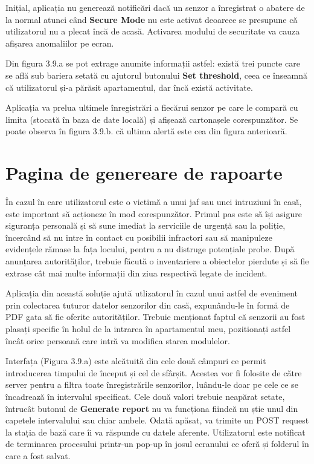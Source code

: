 Inițial, aplicația nu generează notificări dacă un senzor a înregistrat o abatere de la normal atunci când \textbf{Secure Mode} nu este activat deoarece se presupune că utilizatorul nu a plecat încă de acasă. Activarea modului de securitate va cauza afișarea anomaliilor pe ecran.

Din figura 3.9.a se pot extrage anumite informații astfel: există trei puncte care se află sub bariera setată cu ajutorul butonului \textbf{Set threshold}, ceea ce înseamnă că utilizatorul și-a părăsit apartamentul, dar încă există activitate. 

Aplicația va prelua ultimele înregistrări a fiecărui senzor pe care le compară cu limita (stocată în baza de date locală) și afișează cartonașele corespunzător. Se poate observa în figura 3.9.b. că ultima alertă este cea din figura anterioară.

\break

\section{Pagina de genereare de rapoarte}

În cazul în care utilizatorul este o victimă a unui jaf sau unei intruziuni în casă, este important să acționeze în mod corespunzător. Primul pas este să își asigure siguranța personală și să sune imediat la serviciile de urgență sau la poliție, încercând să nu intre în contact cu posibilii infractori sau să manipuleze evidențele rămase la fața locului, pentru a nu distruge potențiale probe. După anunțarea autorităților, trebuie făcută o inventariere a obiectelor pierdute și să fie extrase cât mai multe informații din ziua respectivă legate de incident.

Aplicația din această soluție ajută utlizatorul în cazul unui astfel de eveniment prin colectarea tuturor datelor senzorilor din casă, expunându-le în formă de PDF gata să fie oferite autorităților. Trebuie menționat faptul că senzorii au fost plasați specific în holul de la intrarea în apartamentul meu, pozitionați astfel încât orice persoană care intră va modifica starea modulelor.

Interfața (Figura 3.9.a) este alcătuită din cele două câmpuri ce permit introducerea timpului de început și cel de sfârșit. Acestea vor fi folosite de către server pentru a filtra toate înregistrările senzorilor, luându-le doar pe cele ce se încadrează în intervalul specificat. Cele două valori trebuie neapărat setate, întrucât butonul de \textbf{Generate report} nu va funcționa fiindcă nu știe unul din capetele intervalului sau chiar ambele. Odată apăsat, va trimite un POST request la stația de bază care îi va răspunde cu datele aferente. Utilizatorul este notificat de terminarea procesului printr-un pop-up în josul ecranului ce oferă și folderul în care a fost salvat.

